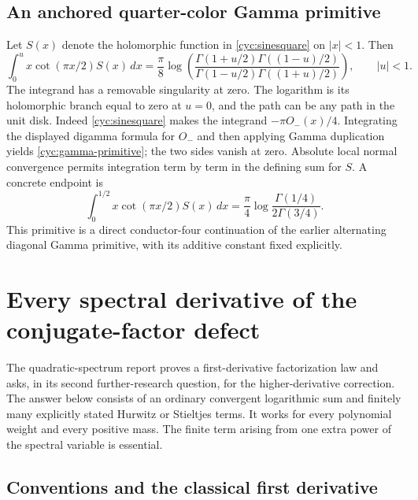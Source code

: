 \documentclass[11pt,a4paper]{article}
\numberwithin{equation}{section}
\theoremstyle{definition}
\theoremstyle{remark}
\begin{document}
\subsection{An anchored quarter-color Gamma primitive}

Let $S(x)$ denote the holomorphic function in
\eqref{cyc:sinesquare} on $|x|<1$.  Then
\begin{equation}\label{cyc:gamma-primitive}
 \boxed{\displaystyle
 \int_0^u x\cot(\pi x/2)S(x)\,dx
  =\frac\pi8\log\!\left(
  \frac{\Gamma(1+u/2)\Gamma((1-u)/2)}
       {\Gamma(1-u/2)\Gamma((1+u)/2)}\right),\qquad |u|<1.}
\end{equation}
The integrand has a removable singularity at zero.  The logarithm
is its holomorphic branch equal to zero at $u=0$, and the path can
be any path in the unit disk.  Indeed \eqref{cyc:sinesquare} makes
the integrand $-\pi O_-(x)/4$.  Integrating the displayed digamma
formula for $O_-$ and then applying Gamma duplication yields
\eqref{cyc:gamma-primitive}; the two sides vanish at zero.
Absolute local normal convergence permits integration term by term
in the defining sum for $S$.  A concrete endpoint is
\[
 \int_0^{1/2}x\cot(\pi x/2)S(x)\,dx
       =\frac\pi4\log\frac{\Gamma(1/4)}{2\Gamma(3/4)}.
\]
This primitive is a direct conductor-four continuation of the
earlier alternating diagonal Gamma primitive, with its additive
constant fixed explicitly.


\section{Every spectral derivative of the conjugate-factor defect}
\label{sd:section}

The quadratic-spectrum report \cite{QSpec} proves a first-derivative
factorization law and asks, in its second further-research question, for
the higher-derivative correction.  The answer below consists of an
ordinary convergent logarithmic sum and finitely many explicitly stated
Hurwitz or Stieltjes terms.  It works for every polynomial weight and
every positive mass.  The finite term arising from one extra power of
the spectral variable is essential.

\subsection{Conventions and the classical first derivative}
\end{document}
